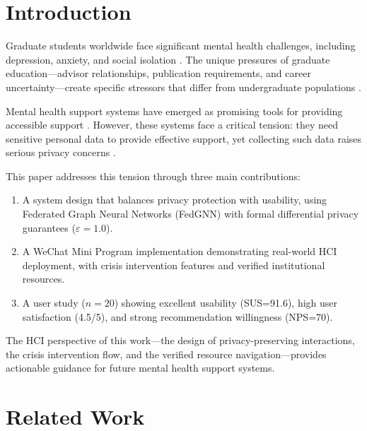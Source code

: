 \documentclass[preprint,12pt]{elsarticle}
\begin{document}
\section{Introduction}

Graduate students worldwide face significant mental health challenges, including
depression, anxiety, and social isolation \citep{gradstress2020}. The unique
pressures of graduate education—advisor relationships, publication requirements,
and career uncertainty—create specific stressors that differ from undergraduate
populations \citep{gradmental2019}.

Mental health support systems have emerged as promising tools for providing
accessible support \citep{mhapps2021}. However, these systems face a critical
tension: they need sensitive personal data to provide effective support, yet
collecting such data raises serious privacy concerns \citep{privacyhealth2020}.

This paper addresses this tension through three main contributions:

\begin{enumerate}
    \item A system design that balances privacy protection with usability, using
          Federated Graph Neural Networks (FedGNN) with formal differential privacy
          guarantees ($\varepsilon=1.0$).

    \item A WeChat Mini Program implementation demonstrating real-world HCI
          deployment, with crisis intervention features and verified institutional
          resources.

    \item A user study ($n=20$) showing excellent usability (SUS=91.6), high user
          satisfaction (4.5/5), and strong recommendation willingness (NPS=70).
\end{enumerate}

The HCI perspective of this work—the design of privacy-preserving interactions,
the crisis intervention flow, and the verified resource navigation—provides
actionable guidance for future mental health support systems.

\section{Related Work}
\end{document}
